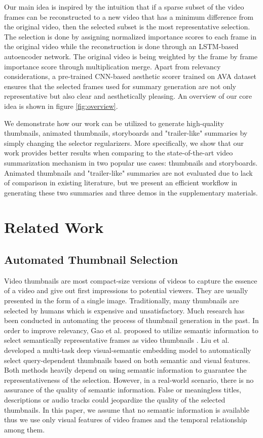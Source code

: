 \documentclass[5pt]{article}
\begin{document}
Our main idea is inspired by the intuition that if a sparse subset of the video frames can be reconstructed to a new video that has a minimum difference from the original video, then the selected subset is the most representative selection. The selection is done by assigning normalized importance scores to each frame in the original video while the reconstruction is done through an LSTM-based autoencoder network. The original video is being weighted by the frame by frame importance score through multiplication merge. Apart from relevancy considerations, a pre-trained CNN-based aesthetic scorer trained on AVA dataset ensures that the selected frames used for summary generation are not only representative but also clear and aesthetically pleasing. An overview of our core idea is shown in figure \ref{fig:overview}.

We demonstrate how our work can be utilized to generate high-quality thumbnails, animated thumbnails, storyboards and "trailer-like" summaries by simply changing the selector regularizers.  More specifically, we show that our work provides better results when comparing to the state-of-the-art video summarization mechanism in two popular use cases: thumbnails and storyboards. Animated thumbnails and "trailer-like" summaries are not evaluated due to lack of comparison in existing literature, but we present an efficient workflow in generating these two summaries and three demos in the supplementary materials.

\section{Related Work}
\subsection{Automated Thumbnail Selection}
Video thumbnails are most compact-size versions of videos to capture the essence of a video and give out first impressions to potential viewers. They are usually presented in the form of a single image. Traditionally, many thumbnails are selected by humans which is expensive and unsatisfactory.  Much research has been conducted in automating the process of thumbnail generation in the past. In order to improve relevancy, Gao et al. proposed to utilize semantic information to select semantically representative frames as video thumbnails \cite{gao2009thematic}. Liu et al. developed a multi-task deep visual-semantic embedding model to automatically select query-dependent thumbnails based on both semantic and visual features\cite{liu2015multi}. Both methods heavily depend on using semantic information to guarantee the representativeness of the selection. However, in a real-world scenario, there is no assurance of the quality of semantic information. False or meaningless titles, descriptions or audio tracks could jeopardize the quality of the selected thumbnails. In this paper, we assume that no semantic information is available thus we use only visual features of video frames and the temporal relationship among them. 
\end{document}
